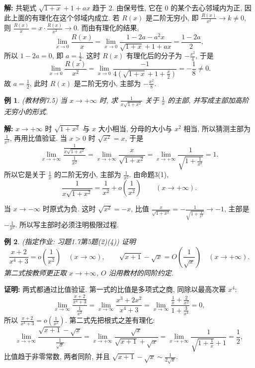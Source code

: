 \documentclass[UTF8,openany]{ctexbook}
\theoremstyle{chinesetextbook}
\newtheorem{example}{例}[section]
\newenvironment{cnproof}{\par\indent\textbf{证明:} \ignorespaces}{\par}
\newenvironment{cnsolution}{\par\indent\textbf{解:} \ignorespaces}{\par}
\begin{document}
\begin{cnsolution}
共轭式 $\sqrt{1+x}+1+ax$ 趋于 $2$. 由保号性, 它在 $0$ 的某个去心邻域内为正, 因此上面的有理化在这个邻域内成立. 若 $R(x)$ 是二阶无穷小, 即 $\displaystyle\frac{R(x)}{x^2}\to k\ne0$, 则 $\displaystyle\frac{R(x)}x=x\cdot\frac{R(x)}{x^2}\to0$. 而由有理化的结果,
\[
\lim_{x\to0}\frac{R(x)}x=\lim_{x\to0}\frac{1-2a-a^2x}{\sqrt{1+x}+1+ax}=\frac{1-2a}2,
\]
所以 $1-2a=0$, 即 $\displaystyle a=\frac12$. 这时 $R(x)$ 有理化后的分子为 $\displaystyle-\frac{x^2}4$, 于是
\[
\lim_{x\to0}\frac{R(x)}{x^2}=\lim_{x\to0}\frac{-1}{4\left(\sqrt{1+x}+1+\frac x2\right)}=-\frac18\ne0.
\]
故 $\displaystyle a=\frac12$, 此时 $R(x)$ 是二阶无穷小, 主部为 $\displaystyle-\frac{x^2}8$.
\end{cnsolution}
\begin{example}
\textnormal{(教材例7.5)} 当 $x\to+\infty$ 时, 求 $\displaystyle\frac1{x\sqrt{1+x^2}}$ 关于 $\displaystyle\frac1x$ 的主部, 并写成主部加高阶无穷小的形式.
\end{example}
\begin{cnsolution}
$x\to+\infty$ 时 $\sqrt{1+x^2}$ 与 $x$ 大小相当, 分母的大小与 $x^2$ 相当, 所以猜测主部为 $\displaystyle\frac1{x^2}$, 再用比值验证. 当 $x>0$ 时 $\sqrt{x^2}=x$, 于是
\[
\lim_{x\to+\infty}\frac{\frac1{x\sqrt{1+x^2}}}{\frac1{x^2}}=\lim_{x\to+\infty}\frac x{\sqrt{1+x^2}}=\lim_{x\to+\infty}\frac1{\sqrt{1+\frac1{x^2}}}=1.
\]
所以它是关于 $\displaystyle\frac1x$ 的二阶无穷小, 主部为 $\displaystyle\frac1{x^2}$. 由命题3(1),
\[
\frac1{x\sqrt{1+x^2}}=\frac1{x^2}+o\!\left(\frac1{x^2}\right)\qquad(x\to+\infty).
\]
\end{cnsolution}
当 $x\to-\infty$ 时原式为负. 这时 $\sqrt{x^2}=-x$, 比值 $\displaystyle\frac x{\sqrt{1+x^2}}=-\frac1{\sqrt{1+\frac1{x^2}}}\to-1$, 主部是 $\displaystyle-\frac1{x^2}$. 所以写主部时必须注明极限过程.
\begin{example}
\textnormal{(指定作业: 习题1.7第5题(2)(4))} 证明
\[
\frac{x+2}{x^4+3}=o\!\left(\frac1{x^2}\right)\quad(x\to\infty),\qquad\sqrt{x+1}-\sqrt x=O\!\left(\frac1{\sqrt x}\right)\quad(x\to+\infty).
\]
第二式按教师更正取 $x\to+\infty$, $O$ 沿用教材的同阶约定.
\end{example}
\begin{cnproof}
两式都通过比值验证. 第一式的比值是多项式之商, 同除以最高次幂 $x^4$:
\[
\lim_{x\to\infty}\frac{\frac{x+2}{x^4+3}}{\frac1{x^2}}=\lim_{x\to\infty}\frac{x^3+2x^2}{x^4+3}=\lim_{x\to\infty}\frac{\frac1x+\frac2{x^2}}{1+\frac3{x^4}}=0,
\]
所以 $\displaystyle\frac{x+2}{x^4+3}=o\!\left(\frac1{x^2}\right)$. 第二式先把根式之差有理化:
\[
\lim_{x\to+\infty}\frac{\sqrt{x+1}-\sqrt x}{\frac1{\sqrt x}}=\lim_{x\to+\infty}\frac{\sqrt x}{\sqrt{x+1}+\sqrt x}=\lim_{x\to+\infty}\frac1{\sqrt{1+\frac1x}+1}=\frac12,
\]
比值趋于非零常数, 两者同阶, 并且 $\displaystyle\sqrt{x+1}-\sqrt x\sim\frac1{2\sqrt x}$.
\end{cnproof}
\end{document}
